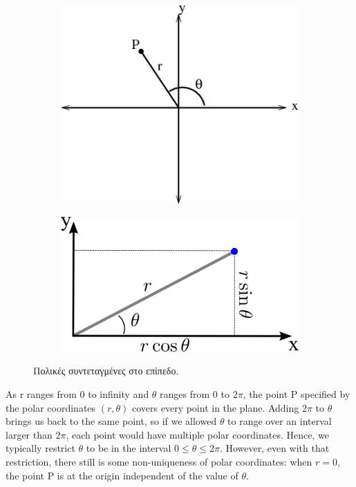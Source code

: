\begin{figure}[h]
   \centering
\begin{subfigure}[h]{0.45\textwidth}
	\centering
   	 \includegraphics[width = \linewidth]{Figures/appendixA_polar_coordinates_whole.png} 
\end{subfigure}
\begin{subfigure}[h]{0.4\textwidth}
	\centering
	\includegraphics[width = \linewidth]{Figures/appendixA_polar_coordinates.png} 
    \end{subfigure}
    \caption{Πολικές συντεταγμένες στο επίπεδο.}
    \label{fig:apxA_polar_coordinates}
\end{figure}

As r ranges from 0 to infinity and $\theta$ ranges from 0 to $2\pi$, the point P specified by the polar coordinates $(r, \theta)$ covers every point in the plane. Adding $2\pi$ to $\theta$ brings us back to the same point, so if we allowed $\theta$ to range over an interval larger than $2\pi$, each point would have multiple polar coordinates. Hence, we typically restrict $\theta$ to be in the interval $0\leq \theta \leq 2\pi$. However, even with that restriction, there still is some non-uniqueness of polar coordinates: when $r=0$, the point P is at the origin independent of the value of $\theta$.

